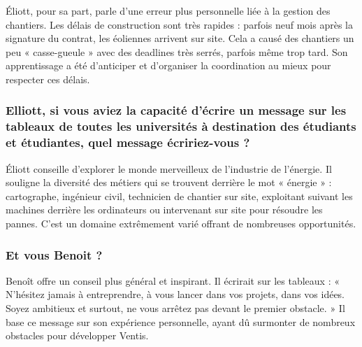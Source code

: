 Éliott, pour sa part, parle d'une erreur plus personnelle liée à la gestion des chantiers. Les délais de construction sont très rapides : parfois neuf mois après la signature du contrat, les éoliennes arrivent sur site. Cela a causé des chantiers un peu « casse-gueule » avec des deadlines très serrés, parfois même trop tard. Son apprentissage a été d'anticiper et d'organiser la coordination au mieux pour respecter ces délais.

\subsubsection{Elliott, si vous aviez la capacité d'écrire un message sur les tableaux de toutes les universités à destination des étudiants et étudiantes, quel message écririez-vous ?}

Éliott conseille d'explorer le monde merveilleux de l'industrie de l'énergie. Il souligne la diversité des métiers qui se trouvent derrière le mot « énergie » : cartographe, ingénieur civil, technicien de chantier sur site, exploitant suivant les machines derrière les ordinateurs ou intervenant sur site pour résoudre les pannes. C'est un domaine extrêmement varié offrant de nombreuses opportunités.

\subsubsection{Et vous Benoit ?}

Benoît offre un conseil plus général et inspirant. Il écrirait sur les tableaux : « N'hésitez jamais à entreprendre, à vous lancer dans vos projets, dans vos idées. Soyez ambitieux et surtout, ne vous arrêtez pas devant le premier obstacle. » Il base ce message sur son expérience personnelle, ayant dû surmonter de nombreux obstacles pour développer Ventis.